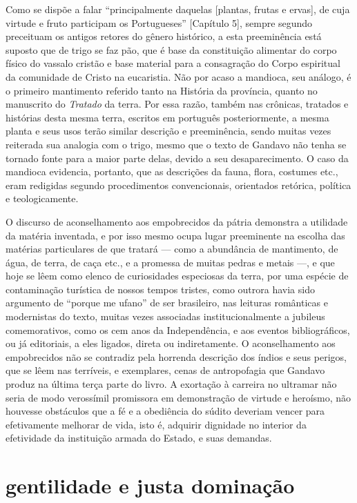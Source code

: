 Como se dispõe a falar ``principalmente daquelas [plantas,
frutas e ervas], de cuja virtude e fruto participam os
Portugueses'' [Capítulo 5], sempre segundo preceituam os
antigos retores do gênero histórico, a esta preeminência está suposto
que de trigo se faz pão, que é base da constituição alimentar do corpo
físico do vassalo cristão e base material para a consagração do Corpo
espiritual da comunidade de Cristo na eucaristia. Não por acaso a
mandioca, seu análogo, é o primeiro mantimento referido tanto na
História da província, quanto no manuscrito do \textit{Tratado} da terra. Por
essa razão, também nas crônicas, tratados e histórias desta mesma
terra, escritos em português posteriormente, a mesma planta e seus usos
terão similar descrição e preeminência, sendo muitas vezes reiterada
sua analogia com o trigo, mesmo que o texto de Gandavo não tenha se
tornado fonte para a maior parte delas, devido a seu desaparecimento. O
caso da mandioca evidencia, portanto, que as descrições da fauna,
flora, costumes etc., eram redigidas segundo procedimentos
convencionais, orientados retórica, política e teologicamente.

O discurso de aconselhamento aos empobrecidos da pátria demonstra a
utilidade da matéria inventada, e por isso mesmo ocupa lugar
preeminente na escolha das matérias particulares de que tratará --- como
a abundância de mantimento, de água, de terra, de caça etc., e a
promessa de muitas pedras e metais ---, e que hoje se lêem como elenco de
curiosidades especiosas da terra, por uma espécie de contaminação
turística de nossos tempos tristes, como outrora havia sido argumento
de ``porque me ufano'' de ser brasileiro, nas leituras românticas e
modernistas do texto, muitas vezes associadas institucionalmente a
jubileus comemorativos, como os cem anos da Independência, e aos
eventos bibliográficos, ou já editoriais, a eles ligados, direta ou
indiretamente. O aconselhamento aos empobrecidos não se contradiz pela
horrenda descrição dos índios e seus perigos, que se lêem nas
terríveis, e exemplares, cenas de antropofagia que Gandavo produz na
última terça parte do livro. A exortação à carreira no ultramar não
seria de modo verossímil promissora em demonstração de virtude e heroísmo,
não houvesse obstáculos que a fé e a obediência do súdito deveriam
vencer para efetivamente melhorar de vida, isto é, adquirir dignidade
no interior da efetividade da instituição armada do Estado, e suas
demandas.

\section{gentilidade e justa dominação}

